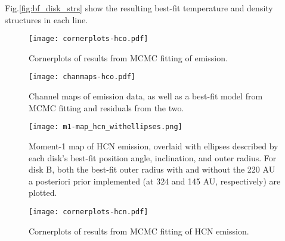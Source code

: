 Fig.\ref{fig:bf_disk_strs} show the resulting best-fit temperature and density structures in each line.












\begin{figure}[htp]
  \hspace*{\fill}%
  \texttt{[image: cornerplots-hco.pdf]}\hfill%
  \hspace*{\fill}%
  \caption{Cornerplots of results from MCMC fitting of \hco emission.}
  \label{fig:hco_cornerplots}
\end{figure}



\begin{figure}[htp]
  \hspace*{\fill}%
  \texttt{[image: chanmaps-hco.pdf]}\hfill%
  \hspace*{\fill}%
  \caption{Channel maps of \hco emission data, as well as a best-fit model from MCMC fitting and residuals from the two.}
  \label{fig:hco_chanmaps}
\end{figure}


\begin{figure}[htp]
  \hspace*{\fill}%
  \texttt{[image: m1-map\_hcn\_withellipses.png]}\hfill%
  \hspace*{\fill}%
  \caption{Moment-1 map of HCN emission, overlaid with ellipses described by each disk's best-fit position angle, inclination, and outer radius. For disk B, both the best-fit outer radius with and without the 220 AU a posteriori prior implemented (at 324 and 145 AU, respectively) are plotted.}
  \label{fig:hcn_m1_ellipses}
\end{figure}


\begin{figure}[htp]
  \hspace*{\fill}%
  \texttt{[image: cornerplots-hcn.pdf]}\hfill%
  \hspace*{\fill}%
  \caption{Cornerplots of results from MCMC fitting of HCN emission.}
  \label{fig:hcn_cornerplots}
\end{figure}



